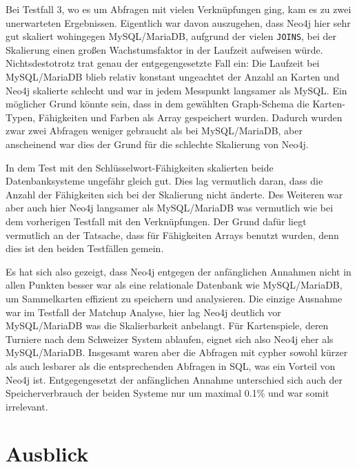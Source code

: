 Bei Testfall 3, wo es um Abfragen mit vielen Verknüpfungen ging, kam es zu zwei unerwarteten Ergebnissen. Eigentlich war davon auszugehen, dass Neo4j hier sehr gut skaliert wohingegen MySQL/MariaDB, aufgrund der vielen \verb|JOINS|, bei der Skalierung einen großen Wachstumsfaktor in der Laufzeit aufweisen würde. Nichtsdestotrotz trat genau der entgegengesetzte Fall ein: Die Laufzeit bei MySQL/MariaDB blieb relativ konstant ungeachtet der Anzahl an Karten und Neo4j skalierte schlecht und war in jedem Messpunkt langsamer als MySQL. Ein möglicher Grund könnte sein, dass in dem gewählten Graph-Schema die Karten-Typen, Fähigkeiten und Farben als Array gespeichert wurden. Dadurch wurden zwar zwei Abfragen weniger gebraucht als bei MySQL/MariaDB, aber anscheinend war dies der Grund für die schlechte Skalierung von Neo4j.

In dem Test mit den Schlüsselwort-Fähigkeiten skalierten beide Datenbanksysteme ungefähr gleich gut. Dies lag vermutlich daran, dass die Anzahl der Fähigkeiten sich bei der Skalierung nicht änderte. Des Weiteren war aber auch hier Neo4j langsamer als MySQL/MariaDB was vermutlich wie bei dem vorherigen Testfall mit den Verknüpfungen. Der Grund dafür liegt vermutlich an der Tatsache, dass für Fähigkeiten Arrays benutzt wurden, denn dies ist den beiden Testfällen gemein.

Es hat sich also gezeigt, dass Neo4j entgegen der anfänglichen Annahmen nicht in allen Punkten besser war als eine relationale Datenbank wie MySQL/MariaDB, um Sammelkarten effizient zu speichern und analysieren. Die einzige Ausnahme war im Testfall der Matchup Analyse, hier lag Neo4j deutlich vor MySQL/MariaDB was die Skalierbarkeit anbelangt. Für Kartenspiele, deren Turniere nach dem Schweizer System ablaufen, eignet sich also Neo4j eher als MySQL/MariaDB. Insgesamt waren aber die Abfragen mit cypher sowohl kürzer als auch lesbarer als die entsprechenden Abfragen in SQL, was ein Vorteil von Neo4j ist. Entgegengesetzt der anfänglichen Annahme unterschied sich auch der Speicherverbrauch der beiden Systeme nur um maximal 0.1\% und war somit irrelevant.

\section{Ausblick}

